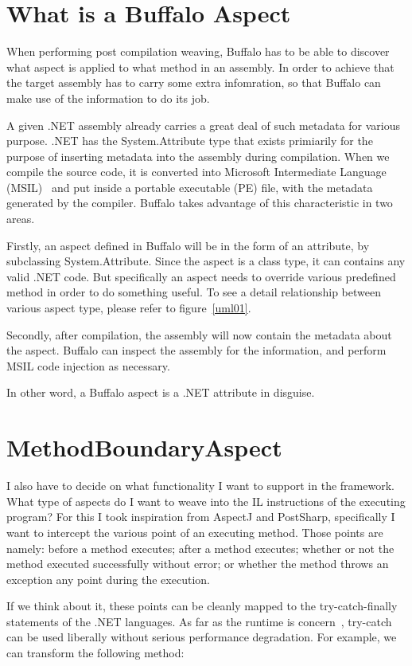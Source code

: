 \section{What is a Buffalo Aspect}

When performing post compilation weaving, Buffalo has to be able to discover what aspect is applied to what method in an assembly. In order to achieve that the target assembly has to carry some extra infomration, so that Buffalo can make use of the information to do its job.

A given .NET assembly already carries a great deal of such metadata for various purpose. .NET has the System.Attribute type that exists primiarily for the purpose of inserting metadata into the assembly during compilation. When we compile the source code, it is converted into Microsoft Intermediate Language (MSIL)~\cite{msil_text} and put inside a portable executable (PE) file, with the metadata generated by the compiler. Buffalo takes advantage of this characteristic in two areas.

Firstly, an aspect defined in Buffalo will be in the form of an attribute, by subclassing System.Attribute. Since the aspect is a class type, it can contains any valid .NET code. But specifically an aspect needs to override various predefined method in order to do something useful. To see a detail relationship between various aspect type, please refer to figure~\ref{uml01}.

Secondly, after compilation, the assembly will now contain the metadata about the aspect. Buffalo can inspect the assembly for the information, and perform MSIL code injection as necessary.

In other word, a Buffalo aspect is a .NET attribute in disguise.

\section{MethodBoundaryAspect}
I also have to decide on what functionality I want to support in the framework. What type of aspects do I want to weave into the IL instructions of the executing program? For this I took inspiration from AspectJ and PostSharp, specifically I want to intercept the various point of an executing method. Those points are namely: before a method executes; after a method executes; whether or not the method executed successfully without error; or whether the method throws an exception any point during the execution.

If we think about it, these points can be cleanly mapped to the try-catch-finally statements of the .NET languages. As far as the runtime is concern~\cite{ecma334, ecma335}, try-catch can be used liberally without serious performance degradation. For example, we can transform the following method:

